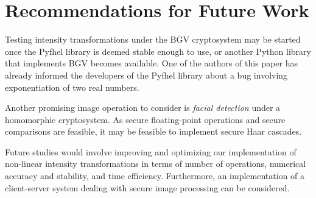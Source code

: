 \section{Recommendations for Future Work}
Testing intensity transformations under the BGV cryptosystem may be started once the Pyfhel library is deemed stable enough to use, or another Python library that implements BGV becomes available.
One of the authors of this paper has already informed the developers of the Pyfhel library about a bug involving exponentiation of two real numbers.


Another promising image operation to consider is \textit{facial detection} under a homomorphic cryptosystem. 
As secure floating-point operations and secure comparisons are feasible, it may be feasible to implement secure Haar cascades.

Future studies would involve improving and optimizing our implementation of non-linear intensity transformations in terms of number of operations, numerical accuracy and stability, and time efficiency.
Furthermore, an implementation of a client-server system dealing with secure image processing can be considered.
